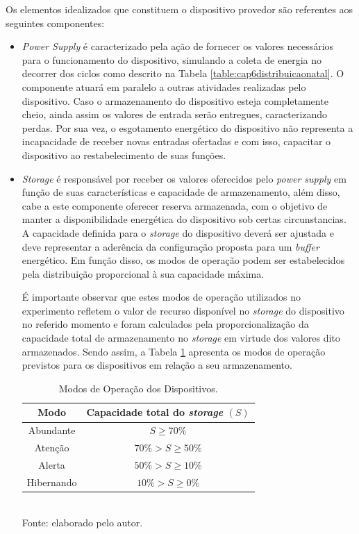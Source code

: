 Os elementos idealizados que constituem o dispositivo provedor são referentes aos seguintes componentes:
\begin{itemize}
	\item \textit{Power Supply} é caracterizado pela ação de fornecer os valores necessários para o funcionamento do dispositivo, simulando a coleta de energia no decorrer dos ciclos como descrito na Tabela \ref{table:cap6distribuicaonatal}. O componente atuará em paralelo a outras atividades realizadas pelo dispositivo. Caso o armazenamento do dispositivo esteja completamente cheio, ainda assim os valores de entrada serão entregues, caracterizando perdas. Por sua vez, o esgotamento energético do dispositivo não representa a incapacidade de receber novas entradas ofertadas e com isso, capacitar o dispositivo ao restabelecimento de suas funções.
	
	\item \textit{Storage} é responsável por receber os valores oferecidos pelo \textit{power supply} em função de suas características e capacidade de armazenamento, além disso, cabe a este componente oferecer reserva armazenada, com o objetivo de manter a disponibilidade energética do dispositivo sob certas circunstancias. A capacidade definida para o \textit{storage} do dispositivo deverá ser ajustada e deve representar a aderência da configuração proposta para um \textit{buffer} energético. Em função disso, os modos de operação podem ser estabelecidos pela distribuição proporcional à sua capacidade máxima.
	
	É importante observar que estes modos de operação utilizados no experimento refletem o valor de recurso disponível no \textit{storage} do dispositivo no referido momento e foram calculados pela proporcionalização da capacidade total de armazenamento no \textit{storage} em virtude dos valores dito armazenados. Sendo assim, a Tabela \ref{table:cap6:modos} apresenta os modos de operação previstos para os dispositivos em relação a seu armazenamento.
	
	
	\begingroup
	\begin{table}[htbp]
		
		\centering
		\caption{Modos de Operação dos Dispositivos.}
		\small
		\begin{tabular}{ |c | c |}
			\hline
			Modo &Capacidade total do \textit{storage} $ (S) $\\
			\hline
			Abundante & $S \ge 70\% $\\\hline
			Atenção & $70\% > S \ge 50\% $\\\hline
			Alerta & $ 50\% > S \ge 10\%$ \\\hline
			Hibernando & $10\% > S \ge 0\%$  \\ \hline
		\end{tabular}
		\label{table:cap6:modos}
		\\
		\footnotesize Fonte: elaborado pelo autor.
		

\end{table}
\end{itemize}
